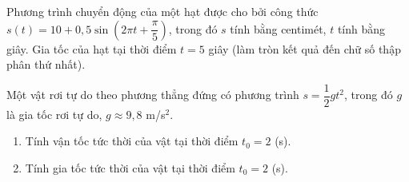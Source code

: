 \begin{bt}%
	Phương trình chuyển động của một hạt được cho bởi công thức $s(t)=10+0{,}5\sin \left(2\pi t+\dfrac{\pi}{5}\right)$, trong đó $s$ tính bằng centimét, $t$ tính bằng giây. Gia tốc của hạt tại thời điểm $t=5$ giây (làm tròn kết quả đến chữ số thập phân thứ nhất).
\end{bt}
\begin{bt}%
	Một vật rơi tự do theo phương thẳng đứng có phương trình $ s=\dfrac{1}{2}gt^{2} $, trong đó $ g $ là gia tốc rơi tự do, $ g\approx 9,8 $ m/s$ ^{2} $.
	\begin{enumerate}
		\item Tính vận tốc tức thời của vật tại thời điểm $ t_{0}=2 $ (s).
		\item Tính gia tốc tức thời của vật tại thời điểm $ t_{0}=2 $ (s).
	\end{enumerate}
\end{bt}
